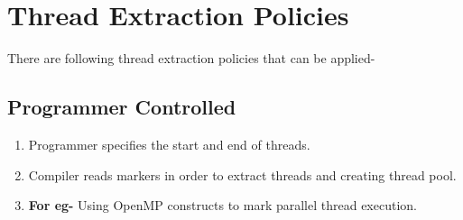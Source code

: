 \documentclass[a4paper,12pt]{article}
\begin{document}
\newpage

\section{Thread Extraction Policies}
There are following thread extraction policies that can be applied-

\subsection{Programmer Controlled}
\begin{enumerate}
\item Programmer specifies the start and end of threads.
\item Compiler reads markers in order to extract threads and creating thread pool.
\item \textbf{For eg-} Using OpenMP constructs to mark parallel thread execution.
\end{enumerate}
\end{document}
